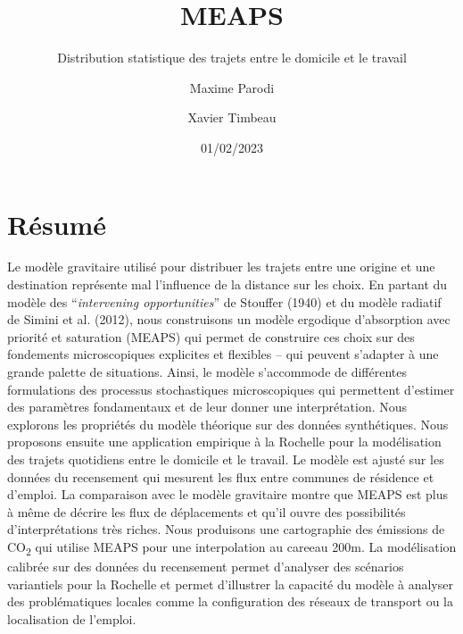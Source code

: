 \documentclass[
  10pt,
  a4paper,
  numbers=noendperiod,
  DIV=9]{scrreprt}
\title{MEAPS}
\subtitle{Distribution statistique des trajets entre le domicile et le
travail}
\author{Maxime Parodi \and Xavier Timbeau}
\date{01/02/2023}
\renewcommand*\contentsname{Table des matières}
\newcommand\contentsname{Table des matières}
\begin{document}
\maketitle
\ifdefined\Shaded\renewenvironment{Shaded}{\begin{tcolorbox}[interior hidden, sharp corners, enhanced, breakable, boxrule=0pt, borderline west={3pt}{0pt}{shadecolor}, frame hidden]}{\end{tcolorbox}}\fi

\renewcommand*\contentsname{Table des matières}
{
\hypersetup{linkcolor=}
\setcounter{tocdepth}{0}
\tableofcontents
}

\hypertarget{ruxe9sumuxe9}{%
\chapter*{Résumé}\label{ruxe9sumuxe9}}


Le modèle gravitaire utilisé pour distribuer les trajets entre une
origine et une destination représente mal l'influence de la distance sur
les choix. En partant du modèle des ``\emph{intervening opportunities}''
de Stouffer (1940) et du modèle radiatif de Simini et al. (2012), nous
construisons un modèle ergodique d'absorption avec priorité et
saturation (MEAPS) qui permet de construire ces choix sur des fondements
microscopiques explicites et flexibles -- qui peuvent s'adapter à une
grande palette de situations. Ainsi, le modèle s'accommode de
différentes formulations des processus stochastiques microscopiques qui
permettent d'estimer des paramètres fondamentaux et de leur donner une
interprétation. Nous explorons les propriétés du modèle théorique sur
des données synthétiques. Nous proposons ensuite une application
empirique à la Rochelle pour la modélisation des trajets quotidiens
entre le domicile et le travail. Le modèle est ajusté sur les données du
recensement qui mesurent les flux entre communes de résidence et
d'emploi. La comparaison avec le modèle gravitaire montre que MEAPS est
plus à même de décrire les flux de déplacements et qu'il ouvre des
possibilités d'interprétations très riches. Nous produisons une
cartographie des émissions de CO\textsubscript{2} qui utilise MEAPS pour
une interpolation au careeau 200m. La modélisation calibrée sur des
données du recensement permet d'analyser des scénarios variantiels pour
la Rochelle et permet d'illustrer la capacité du modèle à analyser des
problématiques locales comme la configuration des réseaux de transport
ou la localisation de l'emploi.
\end{document}
